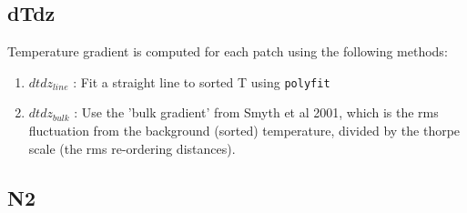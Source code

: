\documentclass[11pt]{article}
\begin{document}
\begin{itemize}








\end{itemize}

\medskip

\subsection{dTdz}

Temperature gradient is computed for each patch using the following methods:
\begin{enumerate}
\item $dtdz_{line}$ : Fit a straight line to sorted T using \verb+polyfit+
\item $dtdz_{bulk}$ : Use the 'bulk gradient' from Smyth et al 2001, which is the rms fluctuation from the background (sorted) temperature, divided by the thorpe scale (the rms re-ordering distances).
\end{enumerate}


\subsection{N2}
\end{document}
